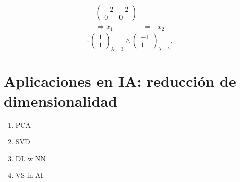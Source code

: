 \documentclass[12pt, letterpaper]{article}
\begin{document}
\begin{enumerate}
\begin{equation*}
\begin{aligned}
\begin{pmatrix}
                -2 & -2 \\
                0 & 0
            \end{pmatrix} \\
            \Rightarrow x_{1} & = -x_{2}
        \end{aligned}
    \end{equation*}
    \begin{equation*}
        \therefore 
        \begin{pmatrix}
            1 \\
            1
        \end{pmatrix}_{\lambda = 3}
        \land 
        \begin{pmatrix}
            -1 \\
            1
        \end{pmatrix}_{\lambda = 7},
    \end{equation*}
\end{enumerate}

\newpage

\section{Aplicaciones en IA: reducción de dimensionalidad}
\begin{enumerate}
    \item PCA
    \item SVD
    \item DL w NN
    \item VS in AI
\end{enumerate}
\end{document}
